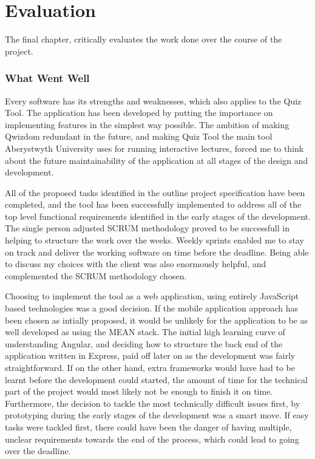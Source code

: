 \chapter{Evaluation}

The final chapter, critically evaluates the work done over the course of the project.

\subsection{What Went Well}
Every software has its strengths and weaknesses, which also applies to the Quiz Tool.
The application has been developed by putting the importance on implementing
features in the simplest way possible. The ambition of making Qwizdom redundant
in the future, and making Quiz Tool the main tool Aberystwyth University uses
for running interactive lectures, forced me to think about the future maintainability
of the application at all stages of the design and development.

All of the proposed tasks identified in the outline project specification have been
completed, and the tool has been successfully implemented to address all of the
top level functional requirements identified in the early stages of the development.
The single person adjusted SCRUM methodology proved to be successfull in helping
to structure the work over the weeks. Weekly sprints enabled me to stay on track
and deliver the working software on time before the deadline. Being able to discuss
my choices with the client was also enormously helpful, and complemented the
SCRUM methodology chosen.

Choosing to implement the tool as a web application, using entirely JavaScript
based technologies was a good decision. If the mobile application approach has
been chosen as intially proposed, it would be unlikely for the application to be
as well developed as using the MEAN stack. The initial high learning curve of
understanding Angular, and deciding how to structure the back end of the application
written in Express, paid off later on as the development was fairly straightforward.
If on the other hand, extra frameworks would have had to be learnt before the development
could started, the amount of time for the technical part of the project would most
likely not be enough to finish it on time. Furthermore, the decision to tackle the most technically
difficult issues first, by prototyping during the early stages of the development
was a smart move. If easy tasks were tackled first, there could have been the
danger of having multiple, unclear requirements towards the end of the process, which
could lead to going over the deadline.

